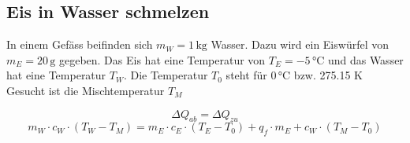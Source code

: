 \subsection{Eis in Wasser schmelzen}

In einem Gefäss beifinden sich $m_W = 1 \, \mathrm{kg}$ Wasser. Dazu wird ein Eiswürfel von $m_E = 20 \, \mathrm{g}$ gegeben. Das Eis hat eine Temperatur von $T_E = -5 \, \text{°C}$ und das Wasser hat eine Temperatur $T_W$. Die Temperatur $T_0$ steht für $0 \, \text{°C}$ bzw. 275.15 K \\
Gesucht ist die Mischtemperatur $T_M$ 

$$ \Delta Q_{ab} = \Delta Q_{zu}$$
$$ m_W \cdot c_W \cdot (T_W - T_M) = m_E \cdot c_E \cdot (T_E - T_0) + q_f \cdot m_E + c_W \cdot (T_M - T_0) $$
